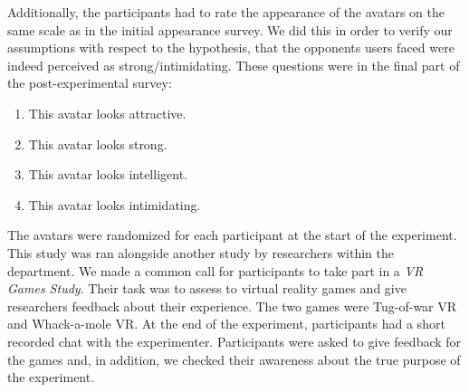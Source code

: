 Additionally, the participants had to rate the appearance of the avatars on the same scale as in the initial appearance survey. We did this in order to verify our assumptions with respect to the hypothesis, that the opponents users faced were indeed perceived as strong/intimidating. These questions were in the final part of the post-experimental survey:
\begin{enumerate}
\itemsep0em 
\item This avatar looks attractive.
\item This avatar looks strong.
\item This avatar looks intelligent.
\item This avatar looks intimidating.
\end{enumerate}
The avatars were randomized for each participant at the start of the experiment. This study was ran alongside another study by researchers within the department. We made a common call for participants to take part in a \textit{VR Games Study}. Their task was to assess to virtual reality games and give researchers feedback about their experience. The two games were Tug-of-war VR and Whack-a-mole VR. At the end of the experiment, participants had a short recorded chat with the experimenter. Participants were asked to give feedback for the games and, in addition, we checked their awareness about the true purpose of the experiment.

